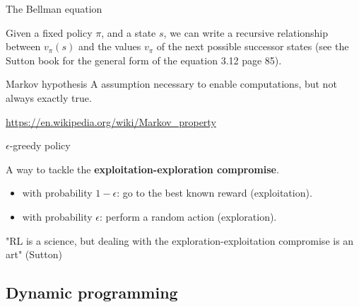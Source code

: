 \documentclass[usenames,dvipsnames]{beamer}
\begin{document}
\begin{frame}{The Bellman equation}

    Given a fixed policy $\pi$, and a state $s$, we can write a recursive relationship between 
    $v_{\pi}(s)$ and the values $v_{\pi}$ of the next possible successor states (see the Sutton book for the general form 
    of the equation 3.12 page 85).

\end{frame}

\begin{frame}{Markov hypothesis}
    A assumption necessary to enable computations, but not always exactly true.

    \url{https://en.wikipedia.org/wiki/Markov_property} 
\end{frame}


\begin{frame}{$\epsilon$-greedy policy}

    A way to tackle the \textbf{exploitation-exploration compromise}.

    \begin{itemize}
        \item with probability $1-\epsilon$: go to the best known reward (exploitation).
        \item with probability $\epsilon$: perform a random action (exploration).
    \end{itemize}

    "RL is a science, but dealing with the exploration-exploitation compromise is an art" (Sutton)
\end{frame}


% 
%     

\subsection{Dynamic programming}%
\label{sec:dynamic_programming}
\end{document}
